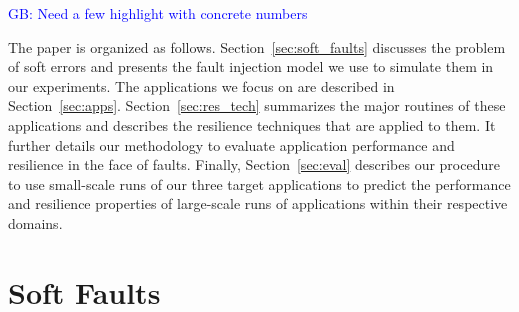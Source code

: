 \documentclass[10pt, conference, compsocconf]{IEEEtran}
\newcommand{\greg}[1]{%
  \textcolor{blue}{GB: #1}
}
\begin{document}

\greg{Need a few highlight with concrete numbers}

The paper is organized as follows.
Section~\ref{sec:soft_faults} discusses the problem of soft errors and presents the fault injection model we use to simulate them in our experiments.
The applications we focus on are described in Section~\ref{sec:apps}.
Section~\ref{sec:res_tech} summarizes the major routines of these applications and describes the resilience techniques that are applied to them.
It further details our methodology to evaluate application performance and resilience in the face of faults.
Finally, Section~\ref{sec:eval} describes our procedure to use small-scale runs of our three target applications to predict the performance and resilience properties of large-scale runs of applications within their respective domains.

\vspace{-10pt}
\section{Soft Faults}
\vspace{-10pt}
\label{sec:soft_faults}
\end{document}
